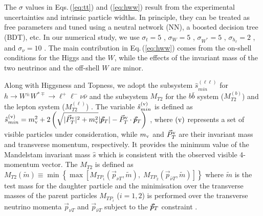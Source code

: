 The $\sigma$ values in Eqs.\,(\ref{eq:tt}) and (\ref{eq:hww}) result from the experimental uncertainties and intrinsic particle widths. In principle, they can be treated as free parameters and tuned using a neutral network (NN), a boosted decision tree (BDT), etc. In our numerical study, we use $\sigma_t=5$ \UGeV, $\sigma_W=5$ \UGeV, $\sigma_{W^*}=5$ \UGeV, $\sigma_{h_\ell}=2$ \UGeV, and $\sigma_\nu = 10 $ \UGeV. 
The main contribution in Eq.\,(\ref{eq:hww}) comes from the on-shell conditions for the Higgs and the $W$, while the effects of the invariant mass of the two neutrinos and the off-shell $W$ are minor. 

Along with Higgsness and Topness, we adopt the subsystem $\hat{s}_{min}^{(\ell\ell)}$ for $h \to W^\pm W^{*\mp}\to\ell^+\ell^- \nu \bar \nu$ \cite{Konar:2008ei,Konar:2010ma} and the subsystem $M_{T2}$ for the $b \bar b$ system ($M_{T2}^{(b)}$) and the lepton system ($M_{T2}^{(\ell)}$) \cite{Burns:2008va}. 
%
The variable $ \hat{s}_{min}^{({\rm v})} $ is defined as $ \hat{s}_{min}^{({\rm v})} = m_{{\rm v}}^2 + 2 \left ( \sqrt{ |\vec P_{T}^{\rm v} |^2 + m_{\rm v}^2 }  |\mptvec| - \vec P_{T}^{\rm v} \cdot \mptvec \right )$ \cite{Konar:2008ei,Konar:2010ma,Barr:2011xt}, where $({\rm v})$ represents a set of visible particles under consideration, while $m_{\rm v}$ and $\vec P_{T}^{\rm v}$ are their invariant mass and transverse momentum, respectively. It provides the minimum value of the Mandelstam invariant mass $\hat s$ which is consistent with the observed visible 4-momentum vector.
%
The $M_{T2}$ is defined as 
$M_{T2} (\tilde m) \equiv \min\left\{\max\left[M_{TP_1}(\vec{p}_{\nu T},\tilde m),\;M_{TP_2} (\vec{p}_{\bar\nu T},\tilde m)\right] \right\}$ where $\tilde m$  is the test mass for the daughter particle and the minimisation over the transverse masses of the parent particles $M_{TP_i}$ ($i=1, 2$) is performed over the transverse neutrino momenta $\vec{p}_{\nu T}$ and $\vec{p}_{\bar\nu T}$ subject to the 
${/\!\!\!\vec{ p}_T} $ constraint  \cite{Lester:1999tx,Burns:2008va,Barr:2011xt,Debnath:2017ktz,Konar:2009wn,Konar:2009qr,Cho:2007qv}. 


